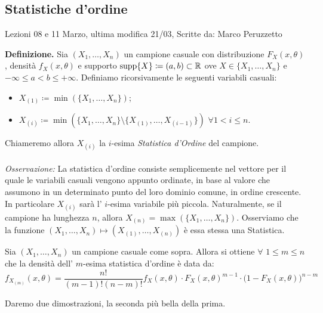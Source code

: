 \subsection{Statistiche d'ordine}
Lezioni 08 e 11 Marzo, ultima modifica 21/03, Scritte da: Marco Peruzzetto

\textbf{Definizione.} Sia $\left(X_1,\ldots ,X_n\right)$ un campione casuale con distribuzione $F_X\left(x,\theta\right)$, densità $f_X\left(x,\theta\right)$ e supporto $\operatorname{supp}\{X\}\coloneqq (a,b)\subset\mathbb{R}$ ove $X\in \{X_1,\ldots,X_n\}$ e $-\infty\leq a<b\leq +\infty$. Definiamo ricorsivamente le seguenti variabili casuali:
\begin{itemize}
\item $X_{(1)}\coloneqq \min\left(\{X_1,\ldots,X_n\}\right)$;
\item $X_{(i)}\coloneqq \min\left(\{X_1,\ldots,X_n\}\setminus\{X_{(1)},\ldots,X_{(i-1)}\}\right)$ $\forall 1<i\leq n$. 
\end{itemize}
Chiameremo allora $X_{(i)}$ la $i$-esima \textit{Statistica d'Ordine} del campione.\\ \\
\textit{Osservazione:} La statistica d'ordine consiste semplicemente nel vettore per il quale le variabili casuali vengono appunto ordinate, in base al valore che assumono in un determinato punto del loro dominio comune, in ordine crescente. In particolare $X_{(i)}$ sarà l' $i$-esima variabile più piccola. Naturalmente, se il campione ha lunghezza $n$, allora $X_{(n)}=\max\left(\{X_1,\ldots,X_n\}\right)$. 
Osserviamo che la funzione $\left(X_1,\ldots,X_n\right)\longmapsto \left(X_{(1)},\ldots,X_{(n)}\right)$ è essa stessa una Statistica.
\begin{theorem}
Sia $\left(X_1,\ldots,X_n\right)$ un campione casuale come sopra. Allora si ottiene $\forall$ $1\leq m\leq n$ che la densità dell' $m$-esima statistica d'ordine è data da: 
\begin{displaymath}
f_{X_{(m)}}\left(x,\theta\right)=\frac{n!}{(m-1)!(n-m)!}f_X\left(x,\theta\right)\cdot F_X\left(x,\theta\right)^{m-1}\cdot \big(1-F_X\left(x,\theta\right)\big)^{n-m}
\end{displaymath}
\end{theorem}
Daremo due dimostrazioni, la seconda più bella della prima.
